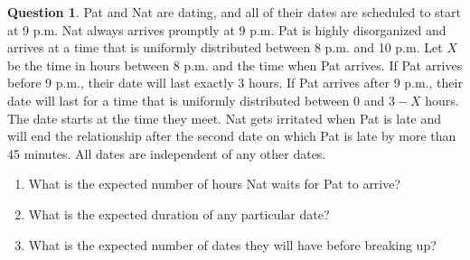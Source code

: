 \documentclass[utf8]{article}
\theoremstyle{definition}%
\newtheorem{question}{Question} %
\theoremstyle{plain}%
\begin{document}
\begin{question}
    Pat and Nat are dating, and all of their dates are scheduled to start at 9 p.m. Nat always arrives promptly at 9 p.m. Pat is highly disorganized and arrives at a time that is uniformly distributed between 8 p.m. and 10 p.m. Let $X$ be the time in hours between 8 p.m. and the time when Pat arrives. If Pat arrives before 9 p.m., their date will last exactly 3 hours. If Pat arrives after 9 p.m., their date will last for a time that is uniformly distributed between 0 and $3 - X$ hours. The date starts at the time they meet. Nat gets irritated when Pat is late and will end the relationship after the second date on which Pat is late by more than 45 minutes. All dates are independent of any other dates.
    \begin{enumerate}[label=(\alph*)]
        \item What is the expected number of hours Nat waits for Pat to arrive? 
        \item What is the expected duration of any particular date?
        \item What is the expected number of dates they will have before breaking up?
    \end{enumerate}
\end{question}
\end{document}
